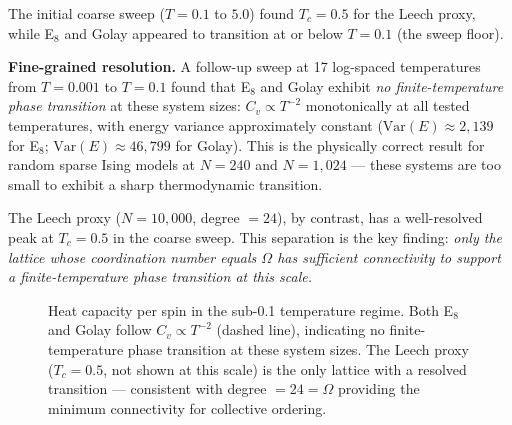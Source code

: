 \documentclass[11pt,a4paper]{article}
\begin{document}
The initial coarse sweep ($T = 0.1$ to $5.0$) found $T_c = 0.5$ for the Leech proxy, while E$_8$ and Golay appeared to transition at or below $T = 0.1$ (the sweep floor).

\noindent\textbf{Fine-grained resolution.}
A follow-up sweep at 17 log-spaced temperatures from $T = 0.001$ to $T = 0.1$ found that E$_8$ and Golay exhibit \emph{no finite-temperature phase transition} at these system sizes: $C_v \propto T^{-2}$ monotonically at all tested temperatures, with energy variance approximately constant ($\mathrm{Var}(E) \approx 2{,}139$ for E$_8$; $\mathrm{Var}(E) \approx 46{,}799$ for Golay).
This is the physically correct result for random sparse Ising models at $N = 240$ and $N = 1{,}024$ --- these systems are too small to exhibit a sharp thermodynamic transition.

The Leech proxy ($N = 10{,}000$, degree $= 24$), by contrast, has a well-resolved peak at $T_c = 0.5$ in the coarse sweep.
This separation is the key finding: \emph{only the lattice whose coordination number equals $\Omega$ has sufficient connectivity to support a finite-temperature phase transition at this scale.}

\begin{figure}[H]
\centering
{}
\caption{Heat capacity per spin in the sub-0.1 temperature regime. Both E$_8$ and Golay follow $C_v \propto T^{-2}$ (dashed line), indicating no finite-temperature phase transition at these system sizes. The Leech proxy ($T_c = 0.5$, not shown at this scale) is the only lattice with a resolved transition --- consistent with degree $= 24 = \Omega$ providing the minimum connectivity for collective ordering.}
\label{fig:fine_tc}
\end{figure}
\end{document}
